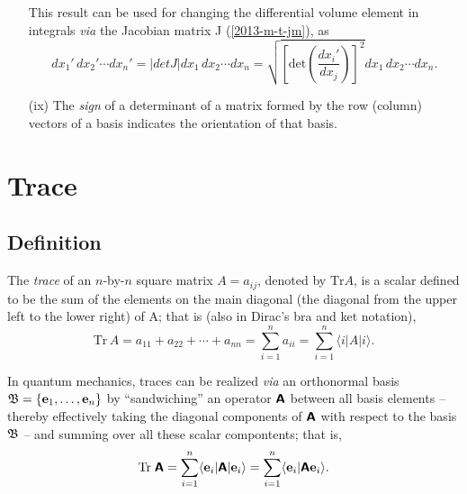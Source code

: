 \begin{itemize}
This result can be used for changing the differential volume element in integrals {\it via} the Jacobian matrix J
(\ref{2013-m-t-jm}), as
\begin{equation}
dx_1'\, dx_2' \cdots dx_n'
= \vert det J \vert dx_1\, dx_2 \cdots dx_n
= \sqrt{\left[\textrm{det}\left(\frac{dx_i'}{dx_j}\right)\right]^2} dx_1\, dx_2 \cdots dx_n
.
\end{equation}

\item[(ix)]
The {\em sign} of a  determinant of a matrix formed by the row (column)
 vectors of a basis indicates the {orientation}
of that basis.

\end{itemize}


\section{Trace}
\label{2013-ch-fdvs-trace}

\subsection{Definition}
The {\em trace} of an $n$-by-$n$ square matrix $A=a_{ij}$, denoted by
$\textrm{Tr} A$,  is a scalar
defined to be the sum of the elements on the main diagonal
 (the diagonal from the upper left to the lower right) of A; that is  (also in Dirac's bra and ket notation),
\begin{equation}
\textrm{Tr}\,A
= a_{11} +a_{22}+ \cdots +a_{nn}
=\sum_{i=1}^n a_{ii}=\sum_{i=1}^n \langle i \vert A\vert i \rangle.
\end{equation}

In quantum mechanics, traces can be realized {\it via} an orthonormal basis ${\frak B} =\{
{\bf e}_1,
\ldots ,
{\bf e}_n
\}$
by ``sandwiching'' an operator $\textsf{\textbf{A}}$ between all basis elements -- thereby effectively taking the diagonal components
of    $\textsf{\textbf{A}}$ with respect to the basis ${\frak B}$ --
and summing over all these scalar compontents; that is,
\begin{equation}
\textrm{Tr}\;\textsf{\textbf{A}}
=\sum_{i=1}^n   \langle {\bf e}_i \vert \textsf{\textbf{A}} \vert {\bf e}_i \rangle
=\sum_{i=1}^n   \langle {\bf e}_i \vert \textsf{\textbf{A}}  {\bf e}_i \rangle
.
\end{equation}

